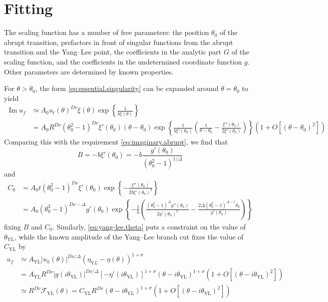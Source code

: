 \documentclass[
aps,
pre,
preprint,
longbibliography,
floatfix
]{revtex4-2}
\begin{document}
\section{Fitting}

The scaling function has a number of free parameters: the position $\theta_0$
of the abrupt transition, prefactors in front of singular functions from the
abrupt transition and the Yang--Lee point, the coefficients in the analytic
part $G$ of the scaling function, and the coefficients in the undetermined
coordinate function $g$. Other parameters are determined by known properties.

For $\theta>\theta_0$, the form \eqref{eq:essential.singularity} can be
expanded around $\theta=\theta_0$ to yield
\begin{equation}
  \begin{aligned}
    \operatorname{Im}u_f
    &\simeq A_0 u_t(\theta)^{D\nu}\xi(\theta)\exp\left\{\frac1{b\xi(\theta)}\right\} \\
    &=A_0R^{D\nu}(\theta_0^2-1)^{D\nu}\xi'(\theta_0)(\theta-\theta_0)
    \exp\left\{\frac1{b\xi'(\theta_0)}\left(\frac1{\theta-\theta_0}
      -\frac{\xi''(\theta_0)}{2\xi'(\theta_0)}\right)
      \right\}\left(1+O[(\theta-\theta_0)^2]\right)
  \end{aligned}
\end{equation}
Comparing this with the requirement \eqref{eq:imaginary.abrupt}, we find that
\begin{equation}
  B=-b\xi'(\theta_0)=-b\frac{g'(\theta_0)}{(\theta_0^2-1)^{1/\Delta}}
\end{equation}
and
\begin{equation}
  \begin{aligned}
    C_0&=A_0t(\theta_0^2-1)^{D\nu}\xi'(\theta_0)\exp\left\{
    -\frac{\xi''(\theta_0)}{2b\xi'(\theta_0)^2}
  \right\} \\
       &=
       A_0(\theta_0^2-1)^{D\nu-\Delta}g'(\theta_0)
       \exp\left\{-\frac1b\left(\frac{(\theta_0^2-1)^\Delta g''(\theta_0)}{2g'(\theta_0)^2}-\frac{2\Delta(\theta_0^2-1)^{\Delta - 1}\theta_0}{g'(\theta_0)}
       \right)\right\}
  \end{aligned}
\end{equation}
fixing $B$ and $C_0$. Similarly, \eqref{eq:yang-lee.theta} puts a constraint on
the value of $\theta_\mathrm{YL}$, while the known amplitude of the Yang--Lee
branch cut fixes the value of $C_\mathrm{YL}$ by
\begin{equation}
  \begin{aligned}
    u_f
    &\simeq A_\mathrm{YL}|u_h(\theta)|^{D\nu/\Delta}(\eta_{\mathrm YL}-\eta(\theta))^{1+\sigma} \\
    &=A_\mathrm{YL}R^{D\nu}|g(i\theta_\mathrm{YL})|^{D\nu/\Delta}[-\eta'(i\theta_\mathrm{YL})]^{1+\sigma}(\theta-i\theta_\mathrm{YL})^{1+\sigma}\left(1+O[(\theta-i\theta_\mathrm{YL})^2]\right)\\
    &\simeq R^{D\nu}\mathcal F_\mathrm{YL}(\theta)
    =C_\mathrm{YL}R^{D\nu}(\theta-i\theta_\mathrm{YL})^{1+\sigma}\left(1+O[(\theta-i\theta_\mathrm{YL})^2]\right)
\end{aligned}
\end{equation}
\end{document}
